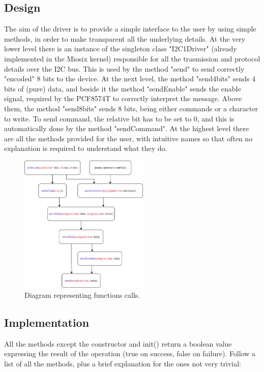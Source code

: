 \documentclass[12pt]{article}
\begin{document}
\subsection{Design}
The aim of the driver is to provide a simple interface to the user by using simple methods, in order to make transparent all the underlying details.
At the very lower level there is an instance of the singleton class "I2C1Driver" (already implemented in the Miosix kernel) responsible for all the trasmission and protocol details over the I2C bus. This is used by the method "send" to send correctly "encoded" 8 bits to the device.
At the next level, the method "send4bits" sends 4 bits of (pure) data, and beside it the method "sendEnable" sends the enable signal, required by the PCF8574T to correctly interpret the message.
Above them, the method "send8bits" sends 8 bits, being either commands or a character to write. To send command, the relative bit has to be set to 0, and this is automatically done by the method "sendCommand".
At the highest level there are all the methods provided for the user, with intuitive names so that often no explanation is required to understand what they do.
\begin{figure}
\centering
\includegraphics[width=0.55\textwidth]{diagram.png}
\caption{\label{fig:}Diagram representing functions calls.}
\end{figure}

\vfill

\subsection{Implementation}
All the methods except the constructor and init() return a boolean value expressing the result of the operation (true on success, false on failure).
Follow a list of all the methods, plus a brief explanation for the ones not very trivial:
\end{document}
